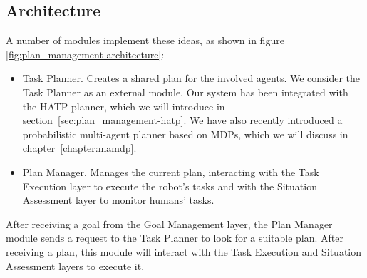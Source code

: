 
\subsection{Architecture}
A number of modules implement these ideas, as shown in figure \ref{fig:plan_management-architecture}:
\begin{itemize}
\item Task Planner. Creates a shared plan for the involved agents. We consider the Task Planner as an external module. Our system has been integrated with the HATP planner, which we will introduce in section~\ref{sec:plan_management-hatp}. We have also recently introduced a probabilistic multi-agent planner based on MDPs, which we will discuss in chapter~\ref{chapter:mamdp}.
\item Plan Manager. Manages the current plan, interacting with the Task Execution layer to execute the robot's tasks and with the Situation Assessment layer to monitor humans' tasks.
\end{itemize}

After receiving a goal from the Goal Management layer, the Plan Manager module sends a request to the Task Planner to look for a suitable plan. After receiving a plan, this module will interact with the Task Execution and Situation Assessment layers to execute it. 

